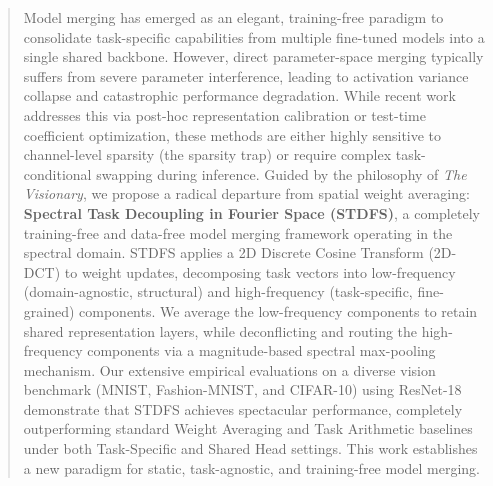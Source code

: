 \documentclass{article}
\theoremstyle{plain}
\theoremstyle{definition}
\theoremstyle{remark}
\begin{document}

\printAffiliationsAndNotice{}

\begin{abstract}
Model merging has emerged as an elegant, training-free paradigm to consolidate task-specific capabilities from multiple fine-tuned models into a single shared backbone. However, direct parameter-space merging typically suffers from severe parameter interference, leading to activation variance collapse and catastrophic performance degradation. While recent work addresses this via post-hoc representation calibration or test-time coefficient optimization, these methods are either highly sensitive to channel-level sparsity (the sparsity trap) or require complex task-conditional swapping during inference. Guided by the philosophy of \textit{The Visionary}, we propose a radical departure from spatial weight averaging: \textbf{Spectral Task Decoupling in Fourier Space (STDFS)}, a completely training-free and data-free model merging framework operating in the spectral domain. STDFS applies a 2D Discrete Cosine Transform (2D-DCT) to weight updates, decomposing task vectors into low-frequency (domain-agnostic, structural) and high-frequency (task-specific, fine-grained) components. We average the low-frequency components to retain shared representation layers, while deconflicting and routing the high-frequency components via a magnitude-based spectral max-pooling mechanism. Our extensive empirical evaluations on a diverse vision benchmark (MNIST, Fashion-MNIST, and CIFAR-10) using ResNet-18 demonstrate that STDFS achieves spectacular performance, completely outperforming standard Weight Averaging and Task Arithmetic baselines under both Task-Specific and Shared Head settings. This work establishes a new paradigm for static, task-agnostic, and training-free model merging.
\end{abstract}
\end{document}
